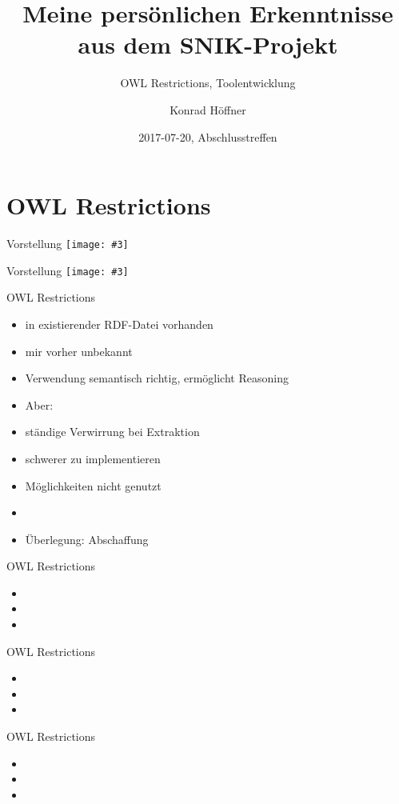 \documentclass{beamer}
\author{Konrad Höffner}
\date{2017-07-20, Abschlusstreffen}
\title{Meine persönlichen Erkenntnisse aus dem SNIK-Projekt}
\subtitle{OWL Restrictions, Toolentwicklung}
\newcommand{\imageslide}[3][]
{
\begin{frame}{#2}
\centering\texttt{[image: \#3]}
\\#1
\end{frame}
}
\begin{document}
\begin{frame}
\titlepage
\end{frame}

\section{OWL Restrictions}

\imageslide{Vorstellung}{img/virtual.png}
\imageslide{Vorstellung}{img/virtual-expectation.png}

\begin{frame}{OWL Restrictions}
\begin{itemize}
\item in existierender RDF-Datei vorhanden
\item mir vorher unbekannt
\item Verwendung semantisch richtig, ermöglicht Reasoning
\item Aber:
\item ständige Verwirrung bei Extraktion 
\item schwerer zu implementieren
\item Möglichkeiten nicht genutzt
\item 
\item Überlegung: Abschaffung
\end{itemize}
\end{frame}

\begin{frame}{OWL Restrictions}
\begin{itemize}
\item 
\item 
\item 
\end{itemize}
\end{frame}

\begin{frame}{OWL Restrictions}
\begin{itemize}
\item 
\item 
\item 
\end{itemize}
\end{frame}

\begin{frame}{OWL Restrictions}
\begin{itemize}
\item 
\item 
\item 
\end{itemize}
\end{frame}
\end{document}
